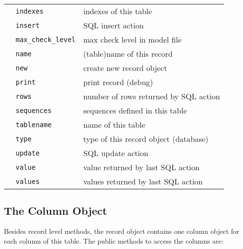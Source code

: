 \begin{tabular}{rl|l}
               &\verb+indexes+              & indexes of this table \\
               &\verb+insert+               & SQL insert action \\
               &\verb+max_check_level+      & max check level in model file \\
               &\verb+name+                 & (table)name of this record \\
               &\verb+new+                  & create new record object \\
               &\verb+print+                & print record (debug) \\
               &\verb+rows+                 & number of rows returned by SQL action \\
               &\verb+sequences+            & sequences defined in this table \\
               &\verb+tablename+            & name of this table \\
               &\verb+type+                 & type of this record object (database) \\
               &\verb+update+               & SQL update action \\
               &\verb+value+                & value returned by last SQL action \\
               &\verb+values+               & values returned by last SQL action \\
\end{tabular}
\medskip

\subsection{The Column Object}
Besides record level methods, the record object contains one column object for each column of this table. The public
methods to access the columns are:

